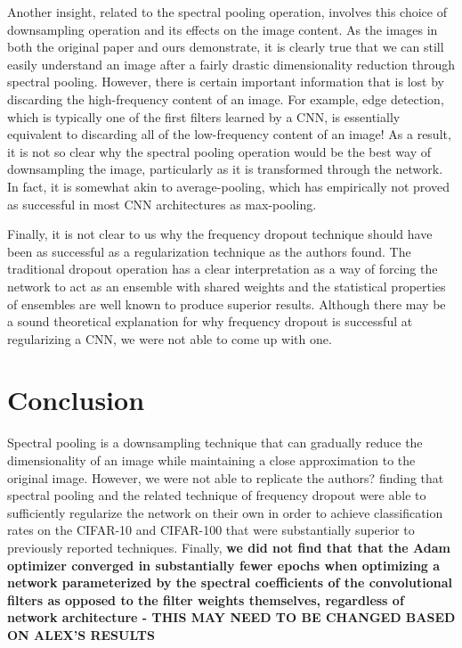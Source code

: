 \documentclass[10pt,journal,compsoc]{IEEEtran}
\begin{document}
Another insight, related to the spectral pooling operation, involves this choice of downsampling operation and its effects on the image content. As the images in both the original paper and ours demonstrate, it is clearly true that we can still easily understand an image after a fairly drastic dimensionality reduction through spectral pooling. However, there is certain important information that is lost by discarding the high-frequency content of an image. For example, edge detection, which is typically one of the first filters learned by a CNN, is essentially equivalent to discarding all of the low-frequency content of an image! As a result, it is not so clear why the spectral pooling operation would be the best way of downsampling the image, particularly as it is transformed through the network. In fact, it is somewhat akin to average-pooling, which has empirically not proved as successful in most CNN architectures as max-pooling. 

Finally, it is not clear to us why the frequency dropout technique should have been as successful as a regularization technique as the authors found. The traditional dropout operation has a clear interpretation as a way of forcing the network to act as an ensemble with shared weights and the statistical properties of ensembles are well known to produce superior results. Although there may be a sound theoretical explanation for why frequency dropout is successful at regularizing a CNN, we were not able to come up with one.

\section{Conclusion}

Spectral pooling is a downsampling technique that can gradually reduce the dimensionality of an image while maintaining a close approximation to the original image. However, we were not able to replicate the authors? finding that spectral pooling and the related technique of frequency dropout were able to sufficiently regularize the network on their own in order to achieve classification rates on the CIFAR-10 and CIFAR-100 that were substantially superior to previously reported techniques. Finally, \textbf{we did not find that that the Adam optimizer converged in substantially fewer epochs when optimizing a network parameterized by the spectral coefficients of the convolutional filters as opposed to the filter weights themselves, regardless of network architecture - THIS MAY NEED TO BE CHANGED BASED ON ALEX'S RESULTS}
\end{document}
